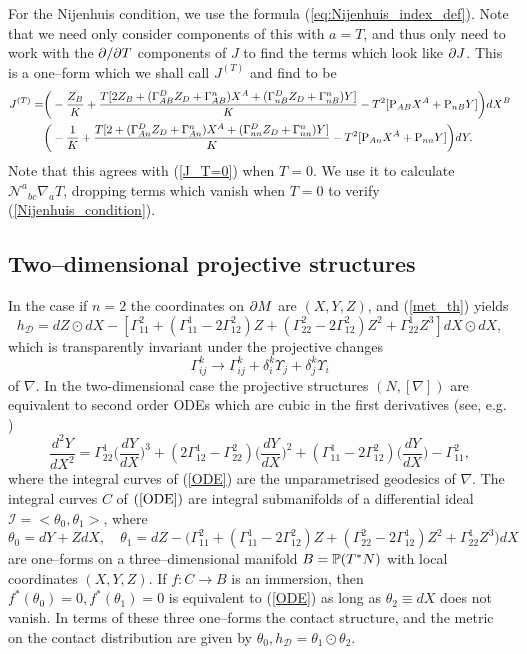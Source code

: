 For the Nijenhuis condition, we use the formula (\ref{eq:Nijenhuis_index_def}). Note that we need only consider components of this with $a=T$, and thus only need to work with the $\partial/\partial T$ components of $J$ to find the terms which look like $\partial J$. This is a one--form which we shall call $J^{(T)}$ and find to be
\[
\begin{split}
J^{(T)}=&\bigg(-\frac{Z_B}{K} + \frac{T[2Z_B + (\Gamma^D_{AB}Z_D+\Gamma^n_{AB})X^A + (\Gamma^D_{nB}Z_D+\Gamma^n_{nB})Y]}{K} - T^2[\mathrm{P}_{AB}X^A+\mathrm{P}_{nB}Y]\bigg)dX^B \\
&\bigg(-\frac{1}{K} + \frac{T[2 + (\Gamma^D_{An}Z_D+\Gamma^n_{An})X^A + (\Gamma^D_{nn}Z_D+\Gamma^n_{nn})Y]}{K} - T^2[\mathrm{P}_{An}X^A+\mathrm{P}_{nn}Y]\bigg)dY.
\end{split}
\]
Note that this agrees with (\ref{J_T=0}) when $T=0$. We use it to calculate ${\mathcal{N}^{a}}_{bc}\nabla_a T$, dropping terms which vanish when $T=0$ to verify (\ref{Nijenhuis_condition}).

\koniec

\subsection{Two--dimensional projective structures}
In the case if $n=2$ the coordinates on $\partial M$ are $(X, Y, Z)$,  and (\ref{met_th}) yields
\[
h_{\mathcal D}=dZ\odot dX-[\Gamma_{11}^2+(\Gamma_{11}^1-2\Gamma_{12}^2)Z+(\Gamma_{22}^2-2\Gamma_{12}^2)Z^2+
\Gamma_{22}^1Z^3]dX\odot dX,
\]
which is transparently invariant under the projective changes 
\[
\Gamma_{ij}^k\longrightarrow \Gamma_{ij}^k+\delta^k_i\Upsilon_j+\delta^k_j\Upsilon_i
\]
of $\nabla$.
In the  two-dimensional case the 
projective
structures $(N, [\nabla])$ are equivalent to second order ODEs which are cubic in
the first derivatives (see, e.g. \cite{BDE})
\begin{equation}
\label{ODE}
\frac{d^2 Y}{d X^2}=\Gamma^1_{22}\Big(\frac{d Y}{d X}\Big)^3
+(2\Gamma^1_{12}-\Gamma^2_{22})\Big(\frac{d Y}{d X}\Big)^2
+(\Gamma^1_{11}-2\Gamma^2_{12})\Big(\frac{d Y}{d X}\Big)-
\Gamma^2_{11},
\end{equation}
where the integral curves of (\ref{ODE}) are the unparametrised geodesics of $\nabla$. 
The integral curves $C$ of $(\ref{ODE})$ are integral submanifolds
of a  differential
ideal ${\mathcal I}=<\theta_0, \theta_1>$, where
\[
\theta_0=dY+ZdX, \quad \theta_1=dZ-\Big(\Gamma_{11}^2+(\Gamma_{11}^1-2\Gamma_{12}^2)Z+(\Gamma_{22}^2-2\Gamma_{12}^1)Z^2+
\Gamma_{22}^1Z^3\Big)dX
\]
are one--forms on a three--dimensional manifold $B=\mathbb{P}(T^*N)$ with local coordinates $(X, Y, Z)$. If $f:C\rightarrow B$ is an immersion, then $f^*(\theta_0)=0, f^*(\theta_1)=0$ is equivalent
to (\ref{ODE}) as long as $\theta_2\equiv dX$ does not vanish. In terms of these three one--forms
the contact structure, and the metric on the contact distribution are given by
$
\theta_0,  h_{\mathcal D}=\theta_1\odot\theta_2.
$


